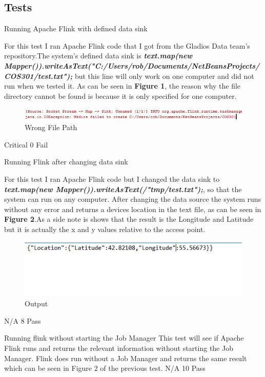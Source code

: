 \subsection{Tests}
\FuncReq
\graphicspath{ {images/} }

{Running Apache Flink with defined data sink}
{For this test I ran Apache Flink code that I got from the Gladios Data team's repository.The system's defined data sink is \textbf{\textit{  text.map(new Mapper()).writeAsText("C:/Users/rob/Documents/NetBeansProjects/COS301/test.txt");}} but this line will only work on one computer and did not run when we tested it. As can be seen in \textbf{Figure 1}, the reason why the file directory cannot be found is because it is only specified for one computer.
			\begin{figure}[h]
				\centering
				\includegraphics{wrong_file_error.jpg}
				\caption{Wrong File Path}
				\label{fig:WrongFIlePath}
			\end{figure} }
{Critical}
{0}
{Fail}
		

{Running Flink after changing data sink}
{For this test I ran Apache Flink code but I changed the data sink to \textbf{\textit{  text.map(new Mapper()).writeAsText(/"tmp/test.txt");}}, so that the system can run on any computer. After changing the data source the system runs without any error and returns a devices location in the text file, as can be seen in \textbf{Figure 2}.As a side note is shows that the result is the Longitude and Latitude but it is actually the x and y values relative to the access point.
		\begin{figure}[h]
			\centering
			\includegraphics{query_location_results.jpg}
			\caption{Output}
			\label{fig:Output}
		\end{figure} 
}
		
{N/A}
{8}
{Pass}
		
{Running flink without starting the Job Manager}
{This test will see if Apache Flink runs and returns the relevant information without starting the Job Manager. Flink does run without a Job Manager and returns the same result which can be seen in Figure 2 of the previous test.}
{N/A}
{10}
{Pass}

